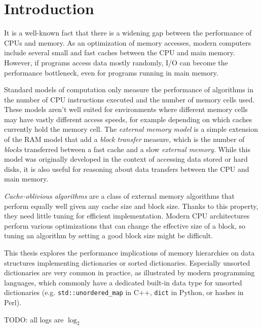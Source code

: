 \chapter*{Introduction}

It is a well-known fact that there is a widening gap between
the performance of CPUs and memory. As an optimization of memory accesses,
modern computers include several small and fast caches between the CPU and
main memory.
However, if programs access data mostly randomly, I/O can become
the performance bottleneck, even for programs running in main memory.

Standard models of computation only measure the performance of algorithms
in the number of CPU instructions executed and the number of memory cells used.
These models aren't well suited for environments where different memory cells
may have vastly different access speeds, for example depending on which caches
currently hold the memory cell. The \textit{external memory model} is a simple
extension of the RAM model that add a \textit{block transfer} measure, which
is the number of \textit{blocks} transferred between a fast cache and a slow
\textit{external memory}. While this model was originally developed
in the context of accessing data stored or hard disks, it is also useful
for reasoning about data transfers between the CPU and main memory.

\textit{Cache-oblivious algorithms} are a class of external memory algorithms
that perform equally well given any cache size and block size. Thanks to this
property, they need little tuning for efficient implementation.
Modern CPU architectures perform various optimizations that can change
the effective size of a block, so tuning an algorithm by setting a good block
size might be difficult.

This thesis explores the performance implications of memory hierarchies
on data structures implementing dictionaries or sorted dictionaries.
Especially unsorted dictionaries are very common in practice, as illustrated
by modern programming languages, which commonly have a dedicated built-in
data type for unsorted dictionaries (e.g. \texttt{std::unordered\_map} in C++,
\texttt{dict} in Python, or hashes in Perl).

TODO: all logs are $\log_2$
